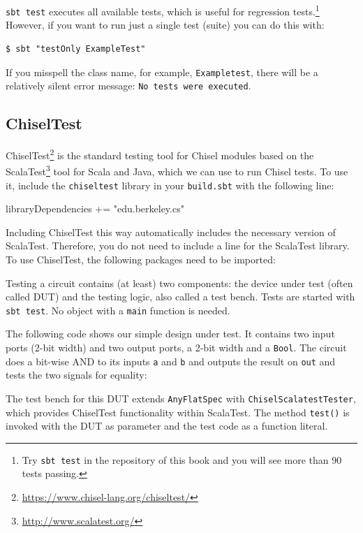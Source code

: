 \documentclass[%
    10pt,
    headinclude, footexclude,
    openright, %
    notitlepage,
    cleardoubleempty,
    headsepline,
    pointlessnumbers,
    bibtotoc, idxtotoc,
    ]{scrbook}
\newcommand{\code}[1]{{\lstinline[basicstyle=\small\ttfamily]{#1}}}
\newcommand{\codefoot}[1]{{\lstinline[basicstyle=\footnotesize\ttfamily]{#1}}}
\newcommand{\myref}[2]{\href{#1}{#2}}
\renewcommand{\myref}[2]{{#2}{\footnote{\url{#1}}}}
\begin{document}
\code{sbt test} executes all available tests, which is useful for regression
tests.\footnote{Try \codefoot{sbt test} in the repository of this book and you
will see more than 90 tests passing.}
However, if you want to run just a single test (suite) you can do this with:

\begin{verbatim}
$ sbt "testOnly ExampleTest"
\end{verbatim}

\noindent If you misspell the class name, for example, \code{Exampletest},
there will be a relatively silent error message: \code{No tests were executed}.

\subsection{ChiselTest}


\myref{https://www.chisel-lang.org/chiseltest/}{ChiselTest} is the standard testing tool
for Chisel modules based on the \myref{http://www.scalatest.org/}{ScalaTest} tool for Scala
and Java, which we can use to run Chisel tests.
To use it, include the \code{chiseltest} library in your \code{build.sbt} with the following line:

\begin{chisel}
libraryDependencies += "edu.berkeley.cs" %
\end{chisel}

\noindent Including ChiselTest this way automatically includes the necessary version of ScalaTest.
Therefore, you do not need to include a line for the ScalaTest library.
To use ChiselTest, the following packages need to be imported:


\noindent Testing a circuit contains (at least) two components: the device under test (often
called DUT) and the testing logic, also called a test bench. Tests are started with \code{sbt test}.
No object with a \code{main} function is needed.

The following code shows our simple design under test. It contains two input
ports (2-bit width) and two output ports, a 2-bit width and a \code{Bool}. The circuit does a bit-wise AND
to its inputs \code{a} and \code{b} and outputs the result on \code{out} and tests the two signals for
equality:


The test bench for this DUT extends \code{AnyFlatSpec} with \code{ChiselScalatestTester},
which provides ChiselTest functionality within ScalaTest.
The method \code{test()} is invoked with the DUT as parameter and the test code as a function literal.
\end{document}
